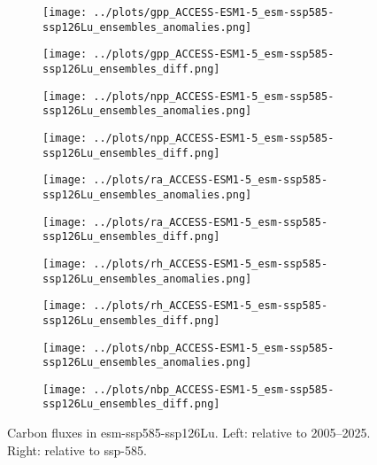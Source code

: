 \documentclass[]{article}
\begin{document}
\begin{figure}[H]
    \centering
    \begin{subfigure}[b]{0.4\linewidth}
        \texttt{[image: ../plots/gpp\_ACCESS-ESM1-5\_esm-ssp585-ssp126Lu\_ensembles\_anomalies.png]}
    \end{subfigure}
    \begin{subfigure}[b]{0.4\linewidth}
        \texttt{[image: ../plots/gpp\_ACCESS-ESM1-5\_esm-ssp585-ssp126Lu\_ensembles\_diff.png]}
    \end{subfigure}
    \begin{subfigure}[b]{0.4\linewidth}
        \texttt{[image: ../plots/npp\_ACCESS-ESM1-5\_esm-ssp585-ssp126Lu\_ensembles\_anomalies.png]}
    \end{subfigure}
    \begin{subfigure}[b]{0.4\linewidth}
        \texttt{[image: ../plots/npp\_ACCESS-ESM1-5\_esm-ssp585-ssp126Lu\_ensembles\_diff.png]}
    \end{subfigure}
    \begin{subfigure}[b]{0.4\linewidth}
        \texttt{[image: ../plots/ra\_ACCESS-ESM1-5\_esm-ssp585-ssp126Lu\_ensembles\_anomalies.png]}
    \end{subfigure}
    \begin{subfigure}[b]{0.4\linewidth}
        \texttt{[image: ../plots/ra\_ACCESS-ESM1-5\_esm-ssp585-ssp126Lu\_ensembles\_diff.png]}
    \end{subfigure}
    \begin{subfigure}[b]{0.4\linewidth}
        \texttt{[image: ../plots/rh\_ACCESS-ESM1-5\_esm-ssp585-ssp126Lu\_ensembles\_anomalies.png]}
    \end{subfigure}
    \begin{subfigure}[b]{0.4\linewidth}
        \texttt{[image: ../plots/rh\_ACCESS-ESM1-5\_esm-ssp585-ssp126Lu\_ensembles\_diff.png]}
    \end{subfigure}
    \begin{subfigure}[b]{0.4\linewidth}
        \texttt{[image: ../plots/nbp\_ACCESS-ESM1-5\_esm-ssp585-ssp126Lu\_ensembles\_anomalies.png]}
    \end{subfigure}
    \begin{subfigure}[b]{0.4\linewidth}
        \texttt{[image: ../plots/nbp\_ACCESS-ESM1-5\_esm-ssp585-ssp126Lu\_ensembles\_diff.png]}
    \end{subfigure}
    \caption{Carbon fluxes in esm-ssp585-ssp126Lu.  Left: relative to 2005–2025. Right: relative to ssp-585.}
    \label{fig:cflux}
\end{figure}
\end{document}
